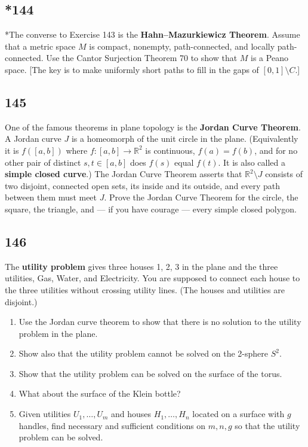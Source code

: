 \documentclass{amsart}
\begin{document}
\subsection*{*144}
*The converse to Exercise 143 is the \textbf{Hahn--Mazurkiewicz Theorem}. Assume that a metric space $M$ is compact, nonempty, path-connected, and locally path-connected. Use the Cantor Surjection Theorem 70 to show that $M$ is a Peano space. [The key is to make uniformly short paths to fill in the gaps of $[0,1] \setminus C$.]

\subsection*{145}
One of the famous theorems in plane topology is the \textbf{Jordan Curve Theorem}. A Jordan curve $J$ is a homeomorph of the unit circle in the plane. (Equivalently it is $f([a,b])$ where $f : [a,b] \to \mathbb{R}^2$ is continuous, $f(a)=f(b)$, and for no other pair of distinct $s,t \in [a,b]$ does $f(s)$ equal $f(t)$. It is also called a \textbf{simple closed curve}.) The Jordan Curve Theorem asserts that $\mathbb{R}^2 \setminus J$ consists of two disjoint, connected open sets, its inside and its outside, and every path between them must meet $J$. Prove the Jordan Curve Theorem for the circle, the square, the triangle, and --- if you have courage --- every simple closed polygon.

\subsection*{146}
The \textbf{utility problem} gives three houses 1, 2, 3 in the plane and the three utilities, Gas, Water, and Electricity. You are supposed to connect each house to the three utilities without crossing utility lines. (The houses and utilities are disjoint.)
\begin{enumerate}[label=(\alph*)]
\item Use the Jordan curve theorem to show that there is no solution to the utility problem in the plane.
\item[*(b)] Show also that the utility problem cannot be solved on the 2-sphere $S^2$.
\item[*(c)] Show that the utility problem can be solved on the surface of the torus.
\item[*(d)] What about the surface of the Klein bottle?
\item[***(e)] Given utilities $U_1,\ldots,U_m$ and houses $H_1,\ldots,H_n$ located on a surface with $g$ handles, find necessary and sufficient conditions on $m,n,g$ so that the utility problem can be solved.
\end{enumerate}
\end{document}

